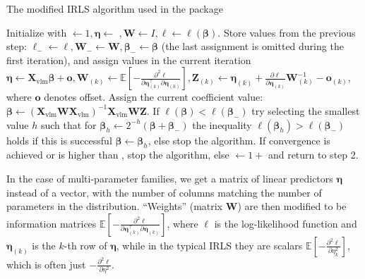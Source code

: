 \documentclass[nojss]{jss}
\newcommand{\1}{\mathcal{I}} \newcommand{\bZero}{\boldsymbol{0}}
\begin{document}
\begin{algorithm}[ht!]
\small
\caption{The modified IRLS algorithm used in the  package}
\label{algo-estimation}\DontPrintSemicolon
{} Initialize with $\leftarrow 1, \boldsymbol{\eta}\leftarrow$
    $, \boldsymbol{W}\leftarrow I, \ell\leftarrow\ell(\boldsymbol{\beta})$.\;
 Store values from the previous step:
    $\ell_{-}\leftarrow\ell, \boldsymbol{W}_{-}\leftarrow\boldsymbol{W}, \boldsymbol{\beta}_{-}\leftarrow\boldsymbol{\beta}$
    (the last assignment is omitted during the first iteration), and assign values in the current iteration
    $\displaystyle\boldsymbol{\eta}\leftarrow\boldsymbol{X}_{\text{vlm}}\boldsymbol{\beta}+\boldsymbol{o}, \boldsymbol{W}_{(k)}\leftarrow\mathbb{E}\left[-\frac{\partial^{2}\ell}{\partial\boldsymbol{\eta}_{(k)}^\top\partial\boldsymbol{\eta}_{(k)}}\right], \boldsymbol{Z}_{(k)}\leftarrow\boldsymbol{\eta}_{(k)}+\frac{\partial\ell}{\partial\boldsymbol{\eta}_{(k)}}\boldsymbol{W}_{(k)}^{-1}-\boldsymbol{o}_{(k)}$,\;
    where $\boldsymbol{o}$ denotes offset.\;
 Assign the current coefficient value:
    $\boldsymbol{\beta}\leftarrow\left(\boldsymbol{X}_{\text{vlm}}\boldsymbol{W}\boldsymbol{X}_{\text{vlm}}\right)^{-1}\boldsymbol{X}_{\text{vlm}}\boldsymbol{W}\boldsymbol{Z}$.\;
 If $\ell(\boldsymbol{\beta})<\ell(\boldsymbol{\beta}_{-})$ try selecting the smallest value $h$ such that for
    $\boldsymbol{\beta}_{h}\leftarrow2^{-h}\left(\boldsymbol{\beta}+\boldsymbol{\beta}_{-}\right)$ the inequality $\ell(\boldsymbol{\beta}_{h})>\ell(\boldsymbol{\beta}_{-})$
    holds if this is successful $\boldsymbol{\beta}\leftarrow\boldsymbol{\beta}_{h}$, else stop the algorithm.\;
 If convergence is achieved or  is higher than , stop the algorithm,
    else $\leftarrow 1+$ and return to step 2.
\end{algorithm}

In the case of multi-parameter families, we get a matrix of linear
predictors \(\boldsymbol{\eta}\) instead of a vector, with the number of
columns matching the number of parameters in the distribution.
``Weights'' (matrix \(\boldsymbol{W}\)) are then modified to be
information matrices
\(\displaystyle\mathbb{E}\left[-\frac{\partial^{2}\ell}{\partial\boldsymbol{\eta}_{(k)}^\top\partial\boldsymbol{\eta}_{(k)}}\right]\),
where \(\ell\) is the log-likelihood function and
\(\boldsymbol{\eta}_{(k)}\) is the \(k\)-th row of
\(\boldsymbol{\eta}\), while in the typical IRLS they are scalars
\(\displaystyle\mathbb{E}\left[-\frac{\partial^{2}\ell}{\partial\eta_{k}^{2}}\right]\),
which is often just
\(\displaystyle-\frac{\partial^{2}\ell}{\partial\eta^{2}}\).
\end{document}
